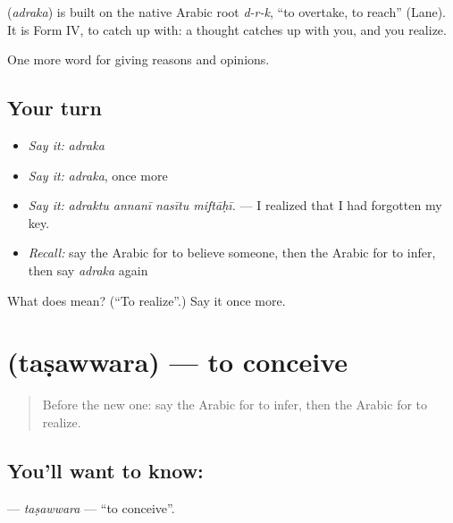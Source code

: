 \begin{cousinweb}
\textbf{} (\emph{adraka}) is built on the native Arabic root \emph{d-r-k}, \textquotedblleft{}to overtake, to reach\textquotedblright{} (Lane). It is Form IV, to catch up with: a thought catches up with you, and you realize.
\end{cousinweb}

\begin{grammarlens}[title={What you've built}]
One more word for giving reasons and opinions.
\end{grammarlens}

\subsection*{Your turn}
\begin{itemize}
\raggedright
  \item \emph{Say it:} \emph{adraka}
  \item \emph{Say it:} \emph{adraka}, once more
  \item \emph{Say it:} \emph{adraktu annanī nasītu miftāḥī.} — I realized that I had forgotten my key.
  \item \emph{Recall:} say the Arabic for to believe someone, then the Arabic for to infer, then say \emph{adraka} again
\end{itemize}

\begin{tcolorbox}[breakable,colback=teal!4,colframe=teal!35!black,title={Before you move on}]
What does  mean? (\textquotedblleft{}To realize\textquotedblright{}.) Say it once more.
\end{tcolorbox}
\section[\texorpdfstring{\ar{تصور} (taṣawwara)}{تصور (taṣawwara)}]{ (taṣawwara) — to conceive}

\label{lesson:AR-C367-tasawwara}



\begin{quote}
Before the new one: say the Arabic for to infer, then the Arabic for to realize.
\end{quote}

\subsection*{You'll want to know: }
\textbf{} — \emph{taṣawwara} — \textquotedblleft{}to conceive\textquotedblright{}.

